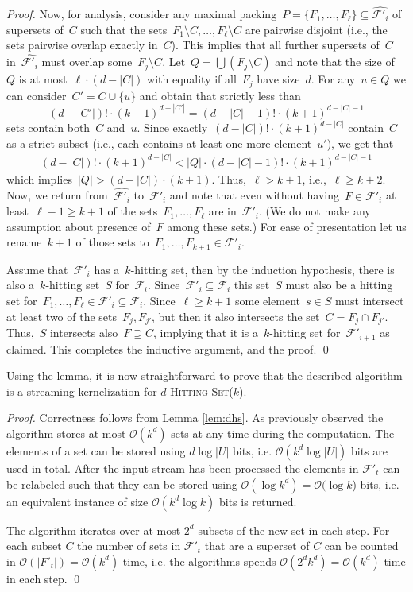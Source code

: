 \documentclass[draft,a4paper]{llncs}
\newcommand{\F}{\ensuremath{\mathcal{F}}\xspace}
\newcommand{\Oh}{\mathcal{O}}
\newcommand{\dHSk}{$d$-\textsc{Hitting Set($k$)}\xspace}
\begin{document}
\begin{proof}
Now, for analysis, consider any maximal packing~$P=\{F_1,\ldots,F_\ell\}\subseteq \hat{\F'_i}$ of supersets of~$C$ such that the sets~$F_1\setminus C,\ldots,F_\ell\setminus C$ are pairwise disjoint (i.e., the sets pairwise overlap exactly in~$C$). This implies that all further supersets of~$C$ in~$\hat{\F'_i}$ must overlap some~$F_j\setminus C$. Let~$Q=\bigcup(F_j\setminus C)$ and note that the size of~$Q$ is at most~$\ell\cdot(d-|C|)$ with equality if all~$F_j$ have size~$d$. For any~$u\in Q$ we can consider~$C'=C\cup\{u\}$ and obtain that strictly less than
\[
(d-|C'|)!\cdot (k+1)^{d-|C'|}=(d-|C|-1)!\cdot (k+1)^{d-|C|-1}
\]
sets contain both~$C$ and~$u$. Since exactly~$(d-|C|)!\cdot (k+1)^{d-|C|}$ contain~$C$ as a strict subset (i.e., each contains at least one more element~$u'$), we get that
\begin{align*}
(d-|C|)!\cdot (k+1)^{d-|C|} < |Q|\cdot (d-|C|-1)!\cdot (k+1)^{d-|C|-1}
\end{align*}
which implies~$|Q|>(d-|C|)\cdot (k+1)$. Thus,~$\ell>k+1$, i.e.,~$\ell\geq k+2$. Now, we return from~$\hat{\F'_i}$ to~$\F'_i$ and note that even without having~$F\in\F'_i$ at least~$\ell-1\geq k+1$ of the sets~$F_1,\ldots,F_\ell$ are in~$\F'_i$. (We do not make any assumption about presence of~$F$ among these sets.) For ease of presentation let us rename~$k+1$ of those sets to~$F_1,\ldots,F_{k+1}\in\F'_i$.

Assume that~$\F'_i$ has a~$k$-hitting set, then by the induction hypothesis, there is also a~$k$-hitting set~$S$ for~$\F_i$. Since~$\F'_i\subseteq \F_i$ this set~$S$ must also be a hitting set for~$F_1,\ldots,F_\ell\in\F'_i\subseteq \F_i$. Since~$\ell\geq k+1$ some element~$s\in S$ must intersect at least two of the sets~$F_j,F_{j'}$, but then it also intersects the set~$C=F_j\cap F_{j'}$. Thus,~$S$ intersects also~$F\supseteq C$, implying that it is a~$k$-hitting set for~$\F'_{i+1}$ as claimed. This completes the inductive argument, and the proof.
\qed \end{proof}

Using the lemma, it is now straightforward to prove that the described algorithm is a streaming kernelization for \dHSk.

\begin{proof}
Correctness follows from Lemma \ref{lem:dhs}. As previously observed the algorithm stores at most $\Oh(k^d)$ sets at any
time during the computation. The elements of a set can be stored using $d \log |U|$ bits, i.e. $\Oh(k^d \log |U|)$ bits are used in total.
After the input stream has been processed the elements in $\F'_t$ can be relabeled such that they can be stored using $\Oh(\log k^d) = \Oh(\log k$) bits, i.e. an equivalent instance of size $\Oh(k^d \log k)$ bits is returned.
 
The algorithm iterates over at most $2^d$ subsets of the new set in each step. For each subset $C$ the number of sets in $\F'_t$ that are a superset of $C$ can be counted in $\Oh(|F'_t|) = \Oh(k^d)$ time, i.e. the algorithms spends $\Oh(2^d k^d) = \Oh(k^d)$ time in each step. \qed
\end{proof}
\end{document}
